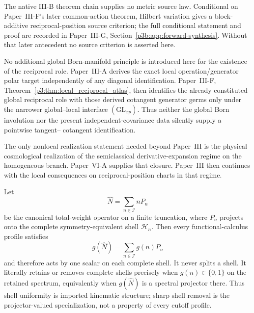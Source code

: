 \documentclass[12pt,a4paper]{article}
\begin{document}
\begin{remark}
The native III-B theorem chain supplies no metric source law.  Conditional on
Paper~III-F's later common-action theorem, Hilbert variation gives a block-
additive reciprocal-position source criterion; the full conditional statement
and proof are recorded in
Paper~III-G, Section~\ref{p3b:app:forward-synthesis}.  Without that later antecedent no
source criterion is asserted here.
\end{remark}


\begin{remark}
\label{p3:rem:p7-chain-closed-cosmology}
\leavevmode\par\noindent
No additional global Born-manifold principle is introduced here for the
existence of the reciprocal role.  Paper~III-A derives the exact local
operation/generator polar target independently of any diagonal identification.
Paper~III-F, Theorem~\ref{p3:thm:local_reciprocal_atlas}, then identifies the
already constituted global reciprocal role with those derived cotangent
generator germs only under the narrower global--local interface
\((\mathrm{GL}_{xp})\).  Thus neither the global Born involution nor the
present independent-covariance data silently supply a pointwise tangent--
cotangent identification.

The only nonlocal realization statement needed beyond Paper~III is the
physical cosmological realization of the semiclassical derivative-expansion
regime on the homogeneous branch.  Paper~VI-A supplies that closure.  Paper~III
then continues with the local consequences on reciprocal-position charts in
that regime.
\end{remark}


\begin{theorem}
\label{p3:thm:shellwise_coarse_graining}
Let
\[
 \widehat N=\sum_{n\in\mathcal I}nP_n
\]
be the canonical total-weight operator on a finite truncation, where \(P_n\)
projects onto the complete symmetry-equivalent shell \(\mathcal H_n\).  Then
every functional-calculus profile satisfies
\[
 g(\widehat N)=\sum_{n\in\mathcal I}g(n)P_n
\]
and therefore acts by one scalar on each complete shell.  It never splits a
shell.  It literally retains or removes complete shells precisely when
\(g(n)\in\{0,1\}\) on the retained spectrum, equivalently when
\(g(\widehat N)\) is a spectral projector there.  Thus shell uniformity is
imported kinematic structure; sharp shell removal is the projector-valued
specialization, not a property of every cutoff profile.
\end{theorem}
\end{document}
